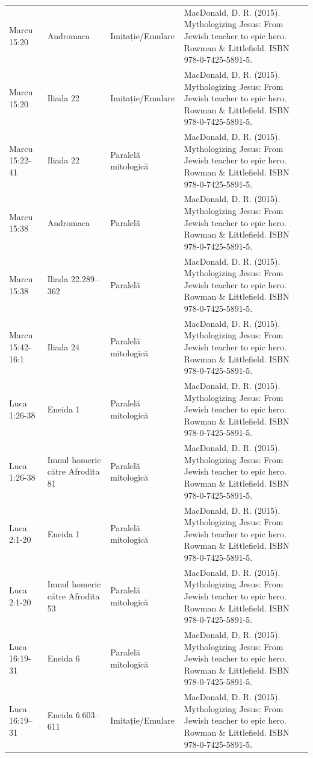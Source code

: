 \documentclass[12pt,a4paper,twoside,openany]{book}
\begin{document}
\begin{longtable}{L{1.4cm}L{1.7cm}L{3.1cm}L{8.4cm}}
Marcu 15:20 & Andromaca & Imitație/Emulare & MacDonald, D. R. (2015). Mythologizing Jesus: From Jewish teacher to epic hero. Rowman \& Littlefield. ISBN 978-0-7425-5891-5. \\
Marcu 15:20 & Iliada 22 & Imitație/Emulare & MacDonald, D. R. (2015). Mythologizing Jesus: From Jewish teacher to epic hero. Rowman \& Littlefield. ISBN 978-0-7425-5891-5. \\
Marcu 15:22-41 & Iliada 22 & Paralelă mitologică & MacDonald, D. R. (2015). Mythologizing Jesus: From Jewish teacher to epic hero. Rowman \& Littlefield. ISBN 978-0-7425-5891-5. \\
Marcu 15:38 & Andromaca & Paralelă & MacDonald, D. R. (2015). Mythologizing Jesus: From Jewish teacher to epic hero. Rowman \& Littlefield. ISBN 978-0-7425-5891-5. \\
Marcu 15:38 & Iliada 22.289–362 & Paralelă & MacDonald, D. R. (2015). Mythologizing Jesus: From Jewish teacher to epic hero. Rowman \& Littlefield. ISBN 978-0-7425-5891-5. \\
Marcu 15:42-16:1 & Iliada 24 & Paralelă mitologică & MacDonald, D. R. (2015). Mythologizing Jesus: From Jewish teacher to epic hero. Rowman \& Littlefield. ISBN 978-0-7425-5891-5. \\
Luca 1:26-38 & Eneida 1 & Paralelă mitologică & MacDonald, D. R. (2015). Mythologizing Jesus: From Jewish teacher to epic hero. Rowman \& Littlefield. ISBN 978-0-7425-5891-5. \\
Luca 1:26-38 & Imnul homeric către Afrodita 81 & Paralelă mitologică & MacDonald, D. R. (2015). Mythologizing Jesus: From Jewish teacher to epic hero. Rowman \& Littlefield. ISBN 978-0-7425-5891-5. \\
Luca 2:1-20 & Eneida 1 & Paralelă mitologică & MacDonald, D. R. (2015). Mythologizing Jesus: From Jewish teacher to epic hero. Rowman \& Littlefield. ISBN 978-0-7425-5891-5. \\
Luca 2:1-20 & Imnul homeric către Afrodita 53 & Paralelă mitologică & MacDonald, D. R. (2015). Mythologizing Jesus: From Jewish teacher to epic hero. Rowman \& Littlefield. ISBN 978-0-7425-5891-5. \\
Luca 16:19-31 & Eneida 6 & Paralelă mitologică & MacDonald, D. R. (2015). Mythologizing Jesus: From Jewish teacher to epic hero. Rowman \& Littlefield. ISBN 978-0-7425-5891-5. \\
Luca 16:19–31 & Eneida 6.603–611 & Imitație/Emulare & MacDonald, D. R. (2015). Mythologizing Jesus: From Jewish teacher to epic hero. Rowman \& Littlefield. ISBN 978-0-7425-5891-5. \\

\end{longtable}
\end{document}
